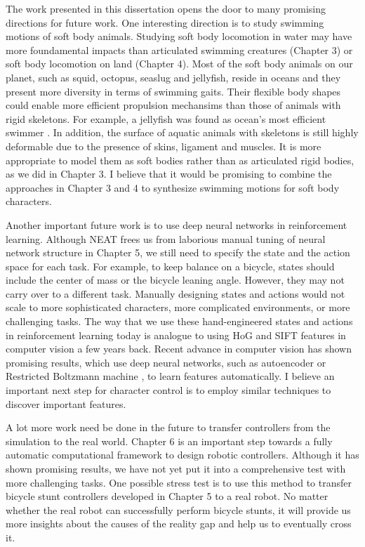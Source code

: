 The work presented in this dissertation opens the door to many promising directions for future work. One interesting direction is to study swimming motions of soft body animals. Studying soft body locomotion in water may have more foundamental impacts than articulated swimming creatures (Chapter 3) or soft body locomotion on land (Chapter 4). Most of the soft body animals on our planet, such as squid, octopus, seaslug and jellyfish, reside in oceans and they present more diversity in terms of swimming gaits. Their flexible body shapes could enable more efficient propulsion mechansims than those of animals with rigid skeletons. For example, a jellyfish was found as ocean's most efficient swimmer \cite{Gemmell:2013}. In addition, the surface of aquatic animals with skeletons is still highly deformable due to the presence of skins, ligament and muscles. It is more appropriate to model them as soft bodies rather than as articulated rigid bodies, as we did in Chapter 3. I believe that it would be promising to combine the approaches in Chapter 3 and 4 to synthesize swimming motions for soft body characters.

Another important future work is to use deep neural networks in reinforcement learning. Although NEAT frees us from laborious manual tuning of neural network structure in Chapter 5, we still need to specify the state and the action space for each task. For example, to keep balance on a bicycle, states should include the center of mass or the bicycle leaning angle. However, they may not carry over to a different task. Manually designing states and actions would not scale to more sophisticated characters, more complicated environments, or more challenging tasks. The way that we use these hand-engineered states and actions in reinforcement learning today is analogue to using HoG and SIFT features in computer vision a few years back. Recent advance in computer vision has shown promising results, which use deep neural networks, such as autoencoder \cite{Vincent:2008} or Restricted Boltzmann machine \cite{Hinton:2012}, to learn features automatically. I believe an important next step for character control is to employ similar techniques to discover important features.

A lot more work need be done in the future to transfer controllers from the simulation to the real world. Chapter 6 is an important step towards a fully automatic computational framework to design robotic controllers. Although it has shown promising results, we have not yet put it into a comprehensive test with more challenging tasks. One possible stress test is to use this method to transfer bicycle stunt controllers developed in Chapter 5 to a real robot. No matter whether the real robot can successfully perform bicycle stunts, it will provide us more insights about the causes of the reality gap and help us to eventually cross it.



